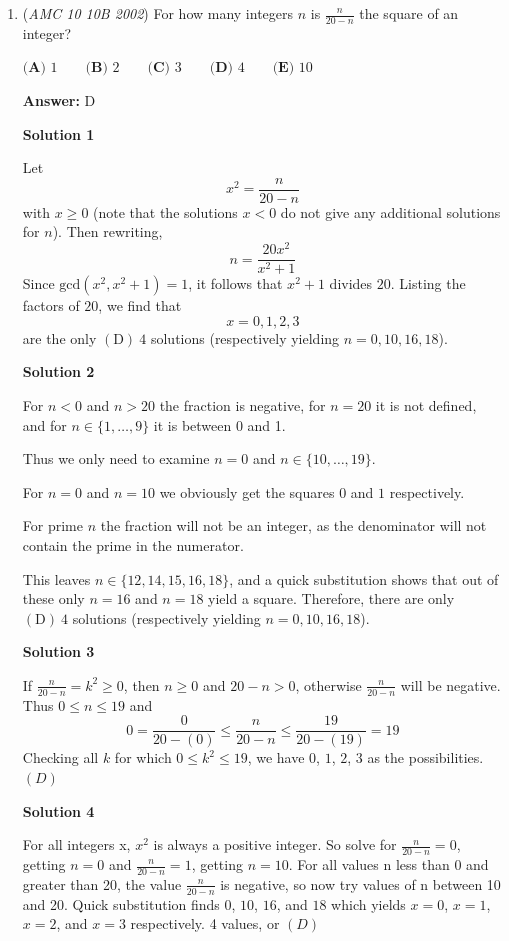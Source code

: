 \begin{enumerate}
 


	\item (\textit{AMC 10 10B 2002}) For how many integers $n$ is $\frac{n}{20-n}$ the square of an integer?


 $\textbf{(A) } 1\qquad \textbf{(B) } 2\qquad \textbf{(C) } 3\qquad \textbf{(D) } 4\qquad \textbf{(E) } 10$

 \textbf{Answer: }D



\textbf{Solution 1}

Let
 \[x^2 = \frac{n}{20-n}\] with $x \ge 0$ (note that the solutions $x < 0$ do not give any additional solutions for $n$). Then rewriting, 
 \[n = \frac{20x^2}{x^2 + 1}\]Since $\text{gcd}(x^2, x^2 + 1) = 1$, it follows that $x^2 + 1$ divides $20$. Listing the factors of $20$, we find that 
 \[x = 0, 1, 2 , 3\]are the only $\boxed{\mathrm{(D)}\ 4}$ solutions (respectively yielding $n = 0, 10, 16, 18$).

 



\textbf{Solution 2}

For $n<0$ and $n>20$ the fraction is negative, for $n=20$ it is not defined, and for $n\in\{1,\dots,9\}$ it is between 0 and 1.

 Thus we only need to examine $n=0$ and $n\in\{10,\dots,19\}$.

 For $n=0$ and $n=10$ we obviously get the squares $0$ and $1$ respectively.

 For prime $n$ the fraction will not be an integer, as the denominator will not contain the prime in the numerator.

 This leaves $n\in\{12,14,15,16,18\}$, and a quick substitution shows that out of these only $n=16$ and $n=18$ yield a square. Therefore, there are only $\boxed{\mathrm{(D)}\ 4}$ solutions (respectively yielding $n = 0, 10, 16, 18$).

 



\textbf{Solution 3}

If $\frac{n}{20-n} = k^2 \ge 0$, then $n \ge 0$ and $20-n > 0$, otherwise $\frac{n}{20-n}$ will be negative. Thus $0 \le n \le 19$ and 
 \[0 = \frac{0}{20-(0)} \le \frac{n}{20-n} \le \frac{19}{20-(19)} = 19\] Checking all $k$ for which $0 \le k^2 \le 19$, we have $0$, $1$, $2$, $3$ as the possibilities. $\boxed{(D)}$




\textbf{Solution 4}

For all integers x, $x^2$ is always a positive integer. So solve for $\frac{n}{20-n} = 0$, getting $n=0$ and $\frac{n}{20-n} = 1$, getting $n =10$. For all values n less than 0 and greater than 20, the value $\frac{n}{20-n}$ is negative, so now try values of n between 10 and 20. Quick substitution finds $0$, $10$, $16$, and $18$ which yields $x=0$, $x=1$, $x=2$, and $x=3$ respectively. 4 values, or $\boxed{(D)}$





\end{enumerate}
